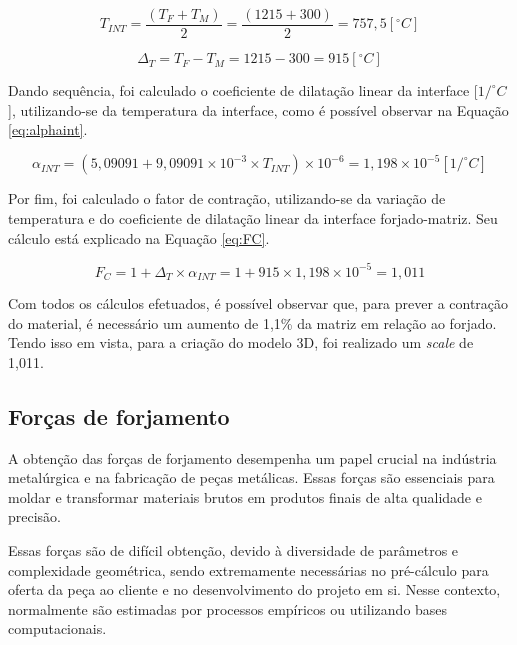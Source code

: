 \documentclass[deposito, acronym, symbols]{fei}
\begin{document}
\begin{equation}
    \label{eq:Tint}
    {T_{INT}}= \frac{({T_{F}}+{T_{M}})}{2}=\frac{(1215+300)}{2}=757,5[^{\circ}C]
\end{equation} 

\begin{equation}
    \label{eq:deltaT}
    {\Delta_{T}}= {T_{F}}-{T_{M}}=1215-300=915[^{\circ}C]
\end{equation} 

Dando sequência, foi calculado o coeficiente de dilatação linear da interface [$ 1/^{\circ}C$], utilizando-se da temperatura da interface, como é possível observar na Equação \ref{eq:alphaint}.

\begin{equation}
    \label{eq:alphaint}
    \alpha_{INT}= (5,09091+9,09091\times{10^{-3}}\times{T_{INT}})\times{10^{-6}}=1,198\times{10^{-5}}[1/^{\circ}C]
\end{equation} 


Por fim, foi calculado o fator de contração, utilizando-se da variação de temperatura e do coeficiente de dilatação linear da interface forjado-matriz. Seu cálculo está explicado na Equação \ref{eq:FC}.

\begin{equation}
    \label{eq:FC}
    {F_{C}}= 1+\Delta_{T}\times\alpha_{INT}=1+915\times1,198\times{10^{-5}}=1,011
\end{equation} 

Com todos os cálculos efetuados, é possível observar que, para prever a contração do material, é necessário um aumento de 1,1\% da matriz em relação ao forjado. Tendo isso em vista, para a criação do modelo 3D, foi realizado um \textit{scale} de 1,011.


\subsection{Forças de forjamento} \label{Força}

A obtenção das forças de forjamento desempenha um papel crucial na indústria metalúrgica e na fabricação de peças metálicas. Essas forças são essenciais para moldar e transformar materiais brutos em produtos finais de alta qualidade e precisão.

Essas forças são de difícil obtenção, devido à diversidade de parâmetros e complexidade geométrica, sendo extremamente necessárias no pré-cálculo para oferta da peça ao cliente e no desenvolvimento do projeto em si. Nesse contexto, normalmente são estimadas por processos empíricos ou utilizando bases computacionais.
\end{document}
